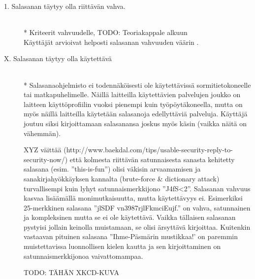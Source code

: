 \documentclass[english,gradu]{tktltiki}
\begin{document}
         \begin{description}

           \item[1. Salasanan täytyy olla riittävän vahva.] \hfill \\
            * Kriteerit vahvuudelle, TODO: Teoriakappale alkuun \\
             Käyttäjät arvioivat helposti salasanan vahvuuden väärin \cite{password_management_strategies_06}.

           \item[X. Salasanan täytyy olla käytettävä] \hfill \\
            * Salasanaohjelmisto ei todennäköisesti ole käytettävissä sormitietokoneelle tai matkapuhelimelle. Näillä laitteilla käytettävien palvelujen joukko on laitteen käyttöprofiilin vuoksi pienempi kuin työpöytäkoneella, mutta on myös näillä laitteilla käytetään salasanoja edellyttäviä palveluja. Käyttäjä joutuu siksi kirjoittamaan salasanansa joskus myös käsin (vaikka näitä on vähemmän).

            XYZ väittää (http://www.baekdal.com/tips/usable-security-reply-to-security-now/) että kolmesta riittävän satunnaisesta sanasta kehitetty salasana (esim. ''this-is-fun'') olisi väkisin arvaamamisen ja sanakirjahyökkäyksen kannalta (brute-force \& dictionary attack) turvallisempi kuin lyhyt satunnaismerkkijono  ''J4fS<2''. Salasanan vahvuus kasvaa lisäämällä monimutkaisuutta, mutta käytettävyys ei. Esimerkiksi 25-merkkinen salasana ''jlSDF vn3987rjlFkmciEujf.'' on vahva, satunnainen ja kompleksinen mutta se ei ole käytettävä. Vaikka tällaisen salasanan pystyisi jollain keinolla muistamaan, se olisi ärsyttävä kirjoittaa. Kuitenkin vastaavan pituinen salasana ''Ihme-Päsmärin mustikkaa!' on paremmin muistettavissa luonnollisen kielen kautta ja sen kirjoittaminen on satunnaismerkkijonoa vaivattomampaa.

            TODO: TÄHÄN XKCD-KUVA



\end{description}
\end{document}
